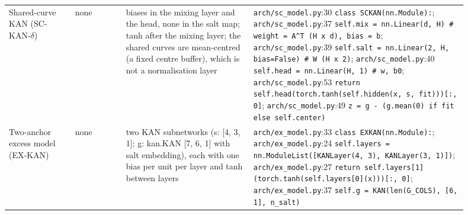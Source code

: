 {\begin{longtable}{R{0.13\linewidth} R{0.10\linewidth} R{0.25\linewidth} R{0.42\linewidth}}
Shared-curve KAN (SC-KAN-$\delta$) & none & biases in the mixing layer and the head, none in the salt map; tanh after the mixing layer; the shared curves are mean-centred (a fixed centre buffer), which is not a normalisation layer & \texttt{arch/\allowbreak{}sc\_\allowbreak{}model.py}:30 \texttt{class SCKAN(\allowbreak{}nn.Module):}; \texttt{arch/\allowbreak{}sc\_\allowbreak{}model.py}:37 \texttt{self.mix = nn.Linear(\allowbreak{}d, \allowbreak{}H)                                       \# weight = A\^{}T (\allowbreak{}H x d), \allowbreak{}bias = b}; \texttt{arch/\allowbreak{}sc\_\allowbreak{}model.py}:39 \texttt{self.salt = nn.Linear(\allowbreak{}2, \allowbreak{}H, \allowbreak{}bias=False)                          \# W (\allowbreak{}H x 2)}; \texttt{arch/\allowbreak{}sc\_\allowbreak{}model.py}:40 \texttt{self.head = nn.Linear(\allowbreak{}H, \allowbreak{}1)                                      \# w, \allowbreak{}b0}; \texttt{arch/\allowbreak{}sc\_\allowbreak{}model.py}:53 \texttt{return self.head(\allowbreak{}torch.tanh(\allowbreak{}self.hidden(\allowbreak{}x, \allowbreak{}s, \allowbreak{}fit)))[:, \allowbreak{}0]}; \texttt{arch/\allowbreak{}sc\_\allowbreak{}model.py}:49 \texttt{z = g - (\allowbreak{}g.mean(\allowbreak{}0) if fit else self.center)} \\
Two-anchor excess model (EX-KAN) & none & two KAN subnetworks (s: [4, 3, 1]; g: kan.KAN [7, 6, 1] with salt embedding), each with one bias per unit per layer and tanh between layers & \texttt{arch/\allowbreak{}ex\_\allowbreak{}model.py}:33 \texttt{class EXKAN(\allowbreak{}nn.Module):}; \texttt{arch/\allowbreak{}ex\_\allowbreak{}model.py}:24 \texttt{self.layers = nn.ModuleList(\allowbreak{}[KANLayer(\allowbreak{}4, \allowbreak{}3), \allowbreak{}KANLayer(\allowbreak{}3, \allowbreak{}1)])}; \texttt{arch/\allowbreak{}ex\_\allowbreak{}model.py}:27 \texttt{return self.layers[1](\allowbreak{}torch.tanh(\allowbreak{}self.layers[0](\allowbreak{}x)))[:, \allowbreak{}0]}; \texttt{arch/\allowbreak{}ex\_\allowbreak{}model.py}:37 \texttt{self.g = KAN(\allowbreak{}len(\allowbreak{}G\_\allowbreak{}COLS), \allowbreak{}[6, \allowbreak{}1], \allowbreak{}n\_\allowbreak{}salt)} \\
\bottomrule
\end{longtable}}